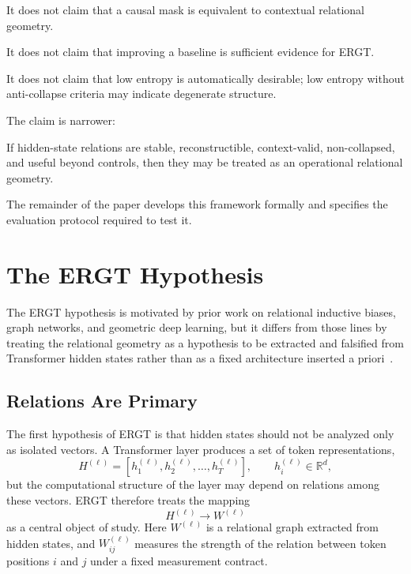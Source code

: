 \documentclass[11pt]{article}
\begin{document}
It does not claim that a causal mask is equivalent to contextual relational geometry.

It does not claim that improving a baseline is sufficient evidence for ERGT.

It does not claim that low entropy is automatically desirable; low entropy without anti-collapse criteria may indicate degenerate structure.

The claim is narrower:
\begin{ergtclaim}
If hidden-state relations are stable, reconstructible, context-valid, non-collapsed, and useful beyond controls, then they may be treated as an operational relational geometry.
\end{ergtclaim}
The remainder of the paper develops this framework formally and specifies the evaluation protocol required to test it.



\section{The ERGT Hypothesis}
\noindent The ERGT hypothesis is motivated by prior work on relational inductive biases, graph networks, and geometric deep learning, but it differs from those lines by treating the relational geometry as a hypothesis to be extracted and falsified from Transformer hidden states rather than as a fixed architecture inserted a priori~\cite{battaglia2018relational,bronstein2021geometric}.


\subsection{Relations Are Primary}

The first hypothesis of ERGT is that hidden states should not be analyzed only as isolated vectors. A Transformer layer produces a set of token representations,
\[
H^{(\ell)}=[h_1^{(\ell)},h_2^{(\ell)},\ldots,h_T^{(\ell)}],
\qquad
h_i^{(\ell)}\in\mathbb{R}^d,
\]
but the computational structure of the layer may depend on relations among these vectors. ERGT therefore treats the mapping
\[
H^{(\ell)}\longrightarrow W^{(\ell)}
\]
as a central object of study. Here $W^{(\ell)}$ is a relational graph extracted from hidden states, and $W_{ij}^{(\ell)}$ measures the strength of the relation between token positions $i$ and $j$ under a fixed measurement contract.
\end{document}
